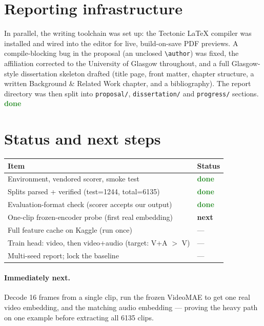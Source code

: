 \documentclass[11pt,a4paper]{article}
\newcommand{\done}{\textcolor{ForestGreen}{\textbf{done}}}
\newcommand{\next}{\textcolor{BurntOrange}{\textbf{next}}}
\begin{document}
\section{Reporting infrastructure}
In parallel, the writing toolchain was set up: the Tectonic LaTeX compiler was installed and
wired into the editor for live, build-on-save PDF previews. A compile-blocking bug in the
proposal (an unclosed \texttt{\textbackslash author}) was fixed, the affiliation corrected to
the University of Glasgow throughout, and a full Glasgow-style dissertation skeleton drafted
(title page, front matter, chapter structure, a written Background \& Related Work chapter, and
a bibliography). The report directory was then split into \texttt{proposal/},
\texttt{dissertation/} and \texttt{progress/} sections. \done

\section{Status and next steps}
\begin{center}
\begin{tabular}{@{}ll@{}}
\toprule
Item & Status \\
\midrule
Environment, vendored scorer, smoke test & \done \\
Splits parsed + verified (test=1244, total=6135) & \done \\
Evaluation-format check (scorer accepts our output) & \done \\
One-clip frozen-encoder probe (first real embedding) & \next \\
Full feature cache on Kaggle (run once) & --- \\
Train head: video, then video+audio (target: V+A $>$ V) & --- \\
Multi-seed report; lock the baseline & --- \\
\bottomrule
\end{tabular}
\end{center}

\paragraph{Immediately next.} Decode 16 frames from a single clip, run the frozen VideoMAE to
get one real video embedding, and the matching audio embedding --- proving the heavy path on
one example before extracting all 6135 clips.
\end{document}
